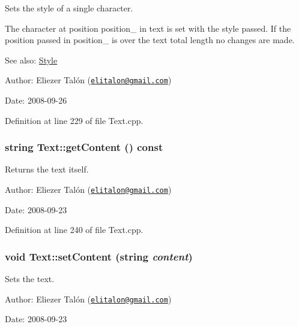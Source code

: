 Sets the style of a single character. 

The character at position position\_\- in text is set with the style passed. If the position passed in position\_\- is over the text total length no changes are made.

\begin{Desc}
\item[See also:]\hyperlink{class_style}{Style}\end{Desc}
\begin{Desc}
\item[Author:]Eliezer Talón (\href{mailto:elitalon@gmail.com}{\tt elitalon@gmail.com}) \end{Desc}
\begin{Desc}
\item[Date:]2008-09-26 \end{Desc}


Definition at line 229 of file Text.cpp.\hypertarget{class_text_b982578fcb4eda8f6cb49927600f859f}{
\subsubsection[getContent]{\setlength{\rightskip}{0pt plus 5cm}string Text::getContent () const}}
\label{class_text_b982578fcb4eda8f6cb49927600f859f}


Returns the text itself. 

\begin{Desc}
\item[Author:]Eliezer Talón (\href{mailto:elitalon@gmail.com}{\tt elitalon@gmail.com}) \end{Desc}
\begin{Desc}
\item[Date:]2008-09-23 \end{Desc}


Definition at line 240 of file Text.cpp.\hypertarget{class_text_422e904d6f93e34741c28099fc5b077a}{
\subsubsection[setContent]{\setlength{\rightskip}{0pt plus 5cm}void Text::setContent (string {\em content})}}
\label{class_text_422e904d6f93e34741c28099fc5b077a}


Sets the text. 

\begin{Desc}
\item[Author:]Eliezer Talón (\href{mailto:elitalon@gmail.com}{\tt elitalon@gmail.com}) \end{Desc}
\begin{Desc}
\item[Date:]2008-09-23 \end{Desc}


